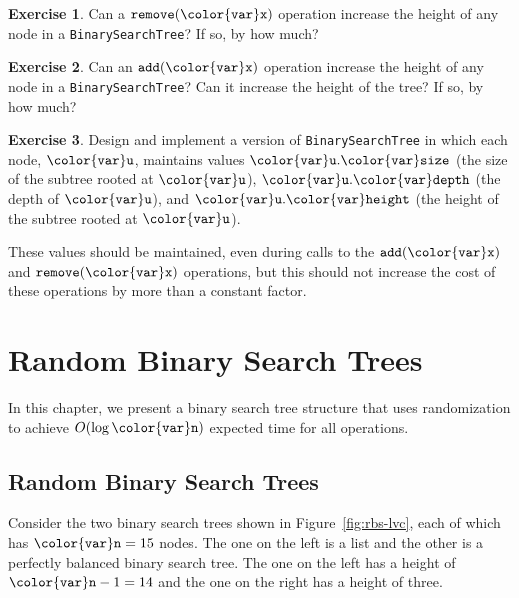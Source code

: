 \documentclass[10pt]{book}
\newcommand{\chaplabel}[1]{\label{chap:#1}}
\newcommand{\seclabel}[1]{\label{sec:#1}}
\newcommand{\figref}[1]{Figure~\ref{fig:#1}}
\theoremstyle{plain}
\theoremstyle{definition}
\newtheorem{exc}{Exercise}[chapter]
\begin{document}
\begin{exc}
  Can a \ensuremath{\mathtt{remove({\color{var}x})}} operation increase the height of any node in a
  \texttt{BinarySearchTree}?  If so, by how much?
\end{exc}

\begin{exc}
  Can an \ensuremath{\mathtt{add({\color{var}x})}} operation increase the height of any node in a
  \texttt{BinarySearchTree}?  Can it increase the height of the tree?  If so,
  by how much?
\end{exc}

\begin{exc}
  Design and implement a version of \texttt{BinarySearchTree} in which each node,
  \ensuremath{\mathtt{{\color{var}u}}}, maintains values \ensuremath{\mathtt{{\color{var}u}.{\color{var}size}}} (the size of the subtree rooted at \ensuremath{\mathtt{{\color{var}u}}}),
  \ensuremath{\mathtt{{\color{var}u}.{\color{var}depth}}} (the depth of \ensuremath{\mathtt{{\color{var}u}}}), and \ensuremath{\mathtt{{\color{var}u}.{\color{var}height}}} (the height of the subtree
  rooted at \ensuremath{\mathtt{{\color{var}u}}}).  

  These values should be maintained, even during calls to the \ensuremath{\mathtt{add({\color{var}x})}}
  and \ensuremath{\mathtt{remove({\color{var}x})}} operations, but this should not increase the cost of
  these operations by more than a constant factor.
\end{exc}

\clearpage

\clearpage
\chapter{Random Binary Search Trees}
\chaplabel{rbs}

In this chapter, we present a binary search tree structure that uses
randomization to achieve $O(\log \ensuremath{\mathtt{{\color{var}n}}})$ expected time for all operations.

\section{Random Binary Search Trees}
\seclabel{rbst}

Consider the two binary search trees shown in \figref{rbs-lvc}, each of
which has $\ensuremath{\mathtt{{\color{var}n}}}=15$ nodes.  The one on the left is a list and the other
is a perfectly balanced binary search tree. The one on the left has a
height of $\ensuremath{\mathtt{{\color{var}n}}}-1=14$ and the one on the right has a height of three.
\end{document}
